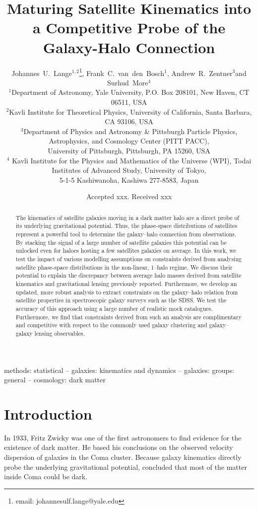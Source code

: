 \documentclass[fleqn,usenatbib,useAMS]{mnras}
\title[Maturing Satellite Kinematics]
{Maturing Satellite Kinematics into a Competitive Probe of the Galaxy-Halo Connection}
\author[J.~U.~Lange et al.]
{Johannes~U.~Lange$^{1, 2}$\thanks{email: johannesulf.lange@yale.edu}, Frank~C.~van~den~Bosch$^1$, Andrew~R.~Zentner$^3$\newauthor and Surhud~More$^4$\\
	$^1$Department of Astronomy, Yale University, P.O. Box 208101, New Haven, CT 06511, USA\\
	$^2$Kavli Institute for Theoretical Physics, University of California, Santa Barbara, CA 93106, USA\\
	$^3$Department of Physics and Astronomy \& Pittsburgh Particle Physics, Astrophysics, and Cosmology Center (PITT PACC),\\University of Pittsburgh, Pittsburgh, PA 15260, USA\\
	$^4$ Kavli Institute for the Physics and Mathematics of the Universe (WPI), Todai Institutes of Advanced Study, University of Tokyo,\\5-1-5 Kashiwanoha, Kashiwa 277-8583, Japan}
\begin{document}
	
	\date{Accepted xxx. Received xxx}
	
	\label{firstpage}
	\pagerange{\pageref{firstpage}--\pageref{lastpage}}
	
	\maketitle
	
	\begin{abstract}
		The kinematics of satellite galaxies moving in a dark matter halo are a direct probe of its underlying gravitational potential. Thus, the phase-space distributions of satellites represent a powerful tool to determine the galaxy--halo connection from observations. By stacking the signal of a large number of satellite galaxies this potential can be unlocked even for haloes hosting a few satellites galaxies on average. In this work, we test the impact of various modelling assumptions on constraints derived from analysing satellite phase-space distributions in the non-linear, 1--halo regime. We discuss their potential to explain the discrepancy between average halo masses derived from satellite kinematics and gravitational lensing previously reported. Furthermore, we develop an updated, more robust analysis to extract constraints on the galaxy--halo relation from satellite properties in spectroscopic galaxy surveys such as the SDSS. We test the accuracy of this approach using a large number of realistic mock catalogues. Furthermore, we find that constraints derived from such an analysis are complimentary and competitive with respect to the commonly used galaxy clustering and galaxy--galaxy lensing observables.
	\end{abstract}
	
	\begin{keywords}
		methods: statistical -- galaxies: kinematics and dynamics -- galaxies: groups: general -- cosmology: dark matter
	\end{keywords}
	
	\section{Introduction}
	
	In 1933, Fritz Zwicky was one of the first astronomers to find evidence for the existence of dark matter. He based his conclusions on the observed velocity dispersion of galaxies in the Coma cluster. Because galaxy kinematics directly probe the underlying gravitational potential, \cite{Zwicky33} concluded that most of the matter inside Coma could be dark. 
	
\end{document}
